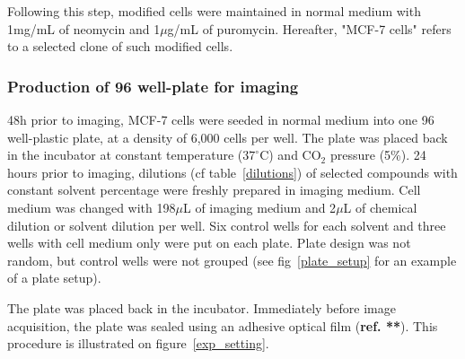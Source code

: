 Following this step, modified cells were maintained in normal medium with 1mg/mL of neomycin and 1$\mu$g/mL of puromycin. Hereafter, "MCF-7 cells" refers to a selected clone of such modified cells.


\subsubsection{Production of 96 well-plate for imaging}
48h prior to imaging, MCF-7 cells were seeded in normal medium into one 96 well-plastic plate, at a density of 6,000 cells per well. The plate was placed back in the incubator at constant temperature ($37^\circ$C) and CO$_2$ pressure (5\%). 24 hours prior to imaging, dilutions (cf table~\ref{dilutions}) of selected compounds with constant solvent percentage were freshly prepared in imaging medium. Cell medium was changed with 198$\mu$L of imaging medium and 2$\mu$L of chemical dilution or solvent dilution per well. Six control wells for each solvent and three wells with cell medium only were put on each plate. Plate design was not random, but control wells were not grouped (see fig~\ref{plate_setup} for an example of a plate setup).

The plate was placed back in the incubator. Immediately before image acquisition, the plate was sealed using an adhesive optical film (\textbf{ref. **}). This procedure is illustrated on figure~\ref{exp_setting}.

